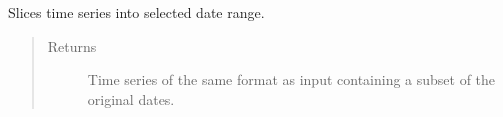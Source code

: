 \documentclass[letterpaper,10pt,english]{sphinxmanual}
\begin{document}
\begin{fulllineitems}
\begin{fulllineitems}
\label{\detokenize{dalio.pipe:dalio.pipe.DateSelect.transform}}
Slices time series into selected date range.
\begin{quote}\begin{description}
\item[{Returns}] \leavevmode
Time series of the same format as input containing a subset of
the original dates.

\end{description}\end{quote}

\end{fulllineitems}


\end{fulllineitems}

\end{document}
